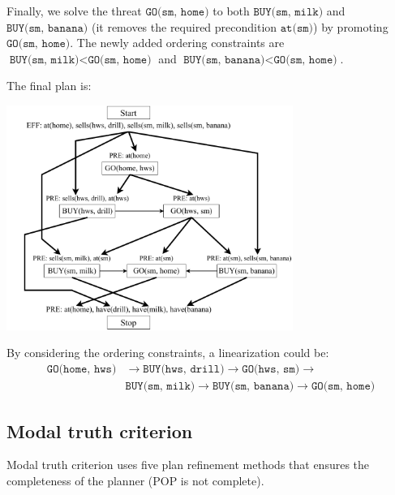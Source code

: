 \begin{example}
\begin{enumerate}
            Finally, we solve the threat $\texttt{GO(sm, home)}$ to 
            both $\texttt{BUY(sm, milk)}$ and $\texttt{BUY(sm, banana)}$ (it removes the required precondition $\texttt{at(sm)}$)
            by promoting $\texttt{GO(sm, home)}$.
            The newly added ordering constraints are 
            $\texttt{BUY(sm, milk)} < \texttt{GO(sm, home)}$ and 
            $\texttt{BUY(sm, banana)} < \texttt{GO(sm, home)}$.
            
            The final plan is:
            \begin{center}
                \includegraphics[width=0.7\textwidth]{img/_pop_example7.pdf}
            \end{center}
            By considering the ordering constraints, a linearization could be:
            \[ 
                \begin{split}
                    \texttt{GO(home, hws)} &\rightarrow  
                    \texttt{BUY(hws, drill)} \rightarrow  
                    \texttt{GO(hws, sm)} \rightarrow\\
                    &\texttt{BUY(sm, milk)} \rightarrow  
                    \texttt{BUY(sm, banana)} \rightarrow  
                    \texttt{GO(sm, home)} 
                \end{split}
            \]
    \end{enumerate}
\end{example}


\subsection{Modal truth criterion}

Modal truth criterion uses five plan refinement methods that 
ensures the completeness of the planner (POP is not complete).

